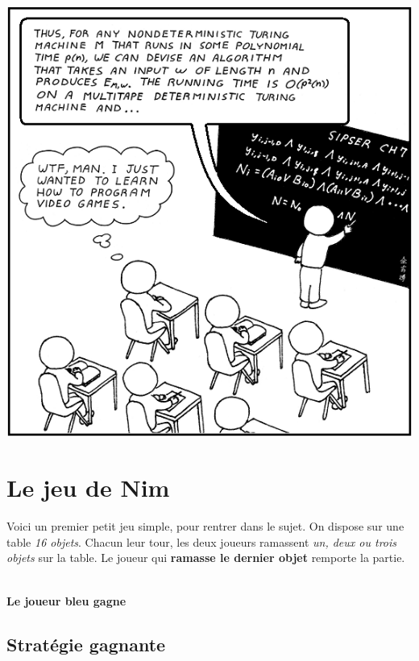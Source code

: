 \documentclass[a5paper,pagesize,DIV=14]{scrbook}
\begin{document}
\begin{center}
  \includegraphics[width=0.7\linewidth]{img/computer_science_major.PNG}
  \label{img:CSmajor}
\end{center}

\chapter*{Le jeu de Nim}

Voici un premier petit jeu simple, pour rentrer dans le sujet. On dispose sur une table \textit{16 objets}. Chacun leur tour, les deux joueurs ramassent \textit{un, deux ou trois objets} sur la table. Le joueur qui \textbf{ramasse le dernier objet} remporte la partie.

\bigskip
 

\bigskip
\bigskip
\bigskip

\begin{center}
 \\
\textbf{Le joueur bleu gagne}
\end{center}

\newpage

\section*{Stratégie gagnante}
\end{document}
